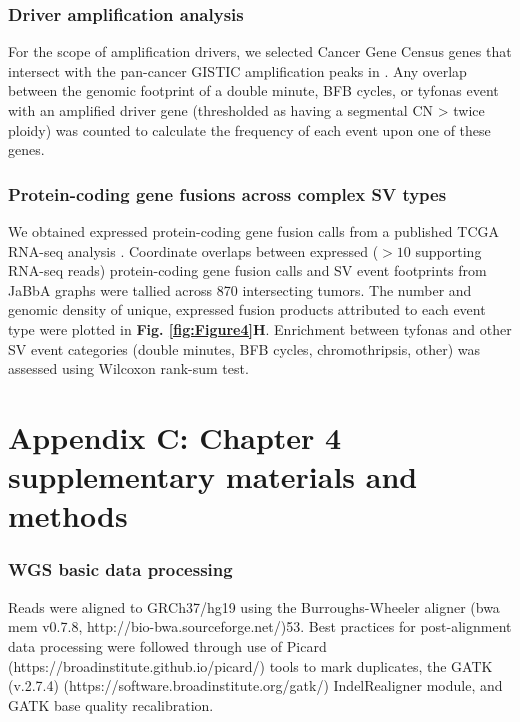 \documentclass[phd,tocprelim]{cornell}
\begin{document}
\subsection*{Driver amplification analysis}

For the scope of amplification drivers, we selected Cancer Gene Census genes that intersect with the pan-cancer GISTIC amplification peaks in \cite{Zack:2013f1f}. Any overlap between the genomic footprint of a double minute, BFB cycles, or tyfonas event with an amplified driver gene (thresholded as having a segmental CN > twice ploidy) was counted to calculate the frequency of each event upon one of these genes.

\subsection*{Protein-coding gene fusions across complex SV types}
We obtained expressed protein-coding gene fusion calls from a published TCGA RNA-seq analysis \cite{Dehghannasiri2019-hk}.  Coordinate overlaps between expressed ($>10$ supporting RNA-seq reads) protein-coding gene fusion calls and SV event footprints from JaBbA graphs were tallied across 870 intersecting tumors. The number and genomic density of unique, expressed fusion products attributed to each event type were plotted in \textbf{Fig. \ref{fig:Figure4}H}.  Enrichment between tyfonas and other SV event categories (double minutes, BFB cycles, chromothripsis, other) was assessed using Wilcoxon rank-sum test.


\chapter*{Appendix C: Chapter 4 supplementary materials and methods} \label{app:c}
\subsection*{WGS basic data processing} \label{app:tc_wgs_processing}
Reads were aligned to GRCh37/hg19 using the Burroughs-Wheeler aligner (bwa mem v0.7.8, http://bio-bwa.sourceforge.net/)53. Best practices for post-alignment data processing were followed through use of Picard (https://broadinstitute.github.io/picard/) tools to mark duplicates, the GATK (v.2.7.4) (https://software.broadinstitute.org/gatk/) IndelRealigner module, and GATK base quality recalibration.
\end{document}
